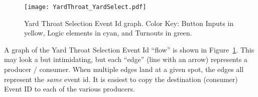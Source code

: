 \begin{figure}[hbpt]\begin{centering}%
\texttt{[image: YardThroat\_YardSelect.pdf]}
\caption{Yard Throat Selection Event Id graph. Color Key: Button Inputs in yellow, Logic elements in cyan, and Turnouts in green.}
\label{fig:YardThroatYardSelect}
\end{centering}\end{figure}

A graph of the Yard Throat Selection Event Id ``flow'' is shown in 
Figure~\ref{fig:YardThroatYardSelect}.  This may look a but intimidating, but 
each ``edge'' (line with an arrow) represents a producer / consumer.  When 
multiple edges land at a given spot, the edges all represent the \textit{same} 
event id.  It is easiest to copy the destination (consumer) Event ID to each 
of the various producers. 
